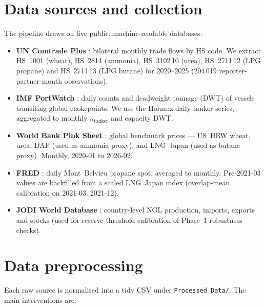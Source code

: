 \documentclass[11pt,a4paper]{article}
\begin{document}
\section{Data sources and collection}

The pipeline draws on five public, machine-readable databases:

\begin{itemize}[leftmargin=1.4em, itemsep=0.15em]
  \item \textbf{UN Comtrade Plus} \citep{comtrade}: bilateral monthly
        trade flows by HS code. We extract HS~1001 (wheat),
        HS~2814 (ammonia), HS~3102\,10 (urea), HS~2711\,12 (LPG
        propane) and HS~2711\,13 (LPG butane) for 2020--2025
        (204\,019 reporter-partner-month observations).
  \item \textbf{IMF PortWatch} \citep{portwatch}: daily counts and
        deadweight tonnage (DWT) of vessels transiting global
        chokepoints. We use the Hormuz daily tanker series, aggregated
        to monthly $n_\text{tanker}$ and capacity $\text{DWT}$.
  \item \textbf{World Bank Pink Sheet} \citep{worldbank_cmo}: global
        benchmark prices --- US~HRW wheat, urea, DAP (used as ammonia
        proxy), and LNG~Japan (used as butane proxy). Monthly,
        2020-01 to 2026-02.
  \item \textbf{FRED} \citep{fred}: daily Mont~Belvieu propane spot,
        averaged to monthly. Pre-2021-03 values are backfilled from a
        scaled LNG~Japan index (overlap-mean calibration on
        2021-03..2021-12).
  \item \textbf{JODI World Database} \citep{jodi}: country-level NGL
        production, imports, exports and stocks (used for
        reserve-threshold calibration of Phase~1 robustness checks).
\end{itemize}

\section{Data preprocessing}

Each raw source is normalised into a tidy CSV under
\texttt{Processed\_Data/}. The main interventions are:
\end{document}

